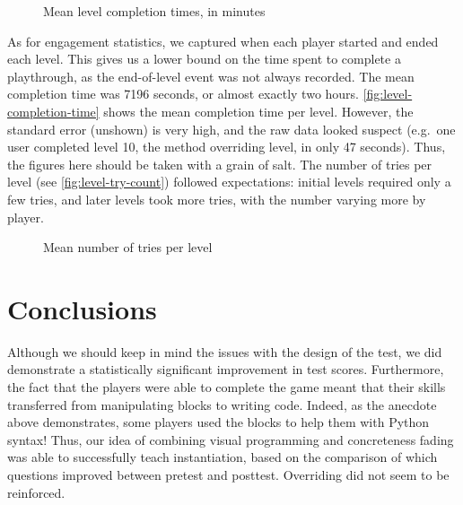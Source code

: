 \documentclass[12pt,notitlepage]{article}
\begin{document}
\begin{figure}
  \centering
  \caption{Mean level completion times, in minutes}\label{fig:level-completion-time}
\end{figure}

As for engagement statistics, we captured when each player started and
ended each level. This gives us a lower bound on the time spent to
complete a playthrough, as the end-of-level event was not always
recorded. The mean completion time was 7196 seconds, or almost exactly
two hours. \autoref{fig:level-completion-time} shows the mean
completion time per level. However, the standard error (unshown) is
very high, and the raw data looked suspect (e.g.\ one user completed
level 10, the method overriding level, in only 47 seconds). Thus, the
figures here should be taken with a grain of salt. The number of tries
per level (see \autoref{fig:level-try-count}) followed expectations:
initial levels required only a few tries, and later levels took more
tries, with the number varying more by player.

\begin{figure}
  \centering
  \caption{Mean number of tries per level}\label{fig:level-try-count}
\end{figure}

\section{Conclusions}

Although we should keep in mind the issues with the design of the
test, we did demonstrate a statistically significant improvement in
test scores. Furthermore, the fact that the players were able to
complete the game meant that their skills transferred from
manipulating blocks to writing code. Indeed, as the anecdote above
demonstrates, some players used the blocks to help them with Python
syntax! Thus, our idea of combining visual programming and
concreteness fading was able to successfully teach instantiation,
based on the comparison of which questions improved between pretest
and posttest. Overriding did not seem to be reinforced.
\end{document}
